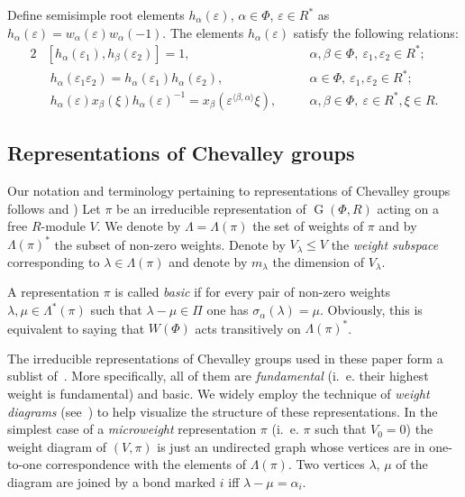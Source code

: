 \documentclass[12pt]{amsart}
\theoremstyle{plain}
\numberwithin{equation}{section}
\numberwithin{lemma}{section}
\theoremstyle{definition}
\theoremstyle{remark}
\DeclareMathOperator{\G}{G}
\begin{document}
Define semisimple root elements $h_\alpha(\varepsilon)$, $\alpha\in\Phi$, $\varepsilon\in R^*$ as $h_\alpha(\varepsilon)=w_\alpha(\varepsilon)w_\alpha(-1)$.
The elements $h_\alpha(\varepsilon)$ satisfy the following relations:
\begin{alignat}{2} 
& [ h_\alpha(\varepsilon_1), h_\beta(\varepsilon_2)] = 1, &\quad& \alpha, \beta \in \Phi, \ \varepsilon_1, \varepsilon_2 \in R^*; \label{rel:h-comm} \\
& \phantom{[} h_\alpha(\varepsilon_1 \varepsilon_2) = h_\alpha(\varepsilon_1) h_\alpha(\varepsilon_2), && \alpha \in \Phi, \ \varepsilon_1, \varepsilon_2 \in R^*; \label{rel:h-mult} \\
& \phantom{[} h_\alpha(\varepsilon)x_\beta(\xi)h_\alpha(\varepsilon)^{-1} = x_\beta\left(\varepsilon^{\langle\beta, \alpha\rangle}\xi\right), && \alpha, \beta \in \Phi, \ \varepsilon \in R^*, \xi \in R. \label{rel:h-w}
\end{alignat}

\subsection{Representations of Chevalley groups} \label{sec:repr}
Our notation and terminology pertaining to representations of Chevalley groups follows \cite[\S~1.4]{PSV98} and \cite[\S~I.2]{Ma69})
Let $\pi$ be an irreducible representation of $\G(\Phi, R)$ acting on a free $R$-module $V$.
We denote by $\Lambda=\Lambda(\pi)$ the set of weights of $\pi$ and by $\Lambda(\pi)^*$ the subset of non-zero weights.
Denote by $V_\lambda \leq V$ the \emph{weight subspace} corresponding to $\lambda\in\Lambda(\pi)$ and denote by $m_\lambda$ the dimension of $V_\lambda$.

A representation $\pi$ is called \emph{basic} if for every pair of non-zero weights $\lambda, \mu \in \Lambda^*(\pi)$ such that $\lambda - \mu \in \Pi$ one has $\sigma_\alpha(\lambda) = \mu$.
Obviously, this is equivalent to saying that $W(\Phi)$ acts transitively on $\Lambda(\pi)^*$.

The irreducible representations of Chevalley groups used in these paper form a sublist of~\cite[Table~2]{PSV98}.
More specifically, all of them are \emph{fundamental} (i.\, e. their highest weight is fundamental) and basic.
We widely employ the technique of \emph{weight diagrams} (see~\cite[\S~2]{PSV98}) to help visualize the structure of these representations.
In the simplest case of a \emph{microweight} representation $\pi$ (i.\, e. $\pi$ such that $V_0 = 0$)
the weight diagram of $(V, \pi)$ is just an undirected graph whose vertices are in one-to-one correspondence with the elements of $\Lambda(\pi)$.
Two vertices $\lambda$, $\mu$ of the diagram are joined by a bond marked $i$ iff $\lambda-\mu = \alpha_i$.
\end{document}
